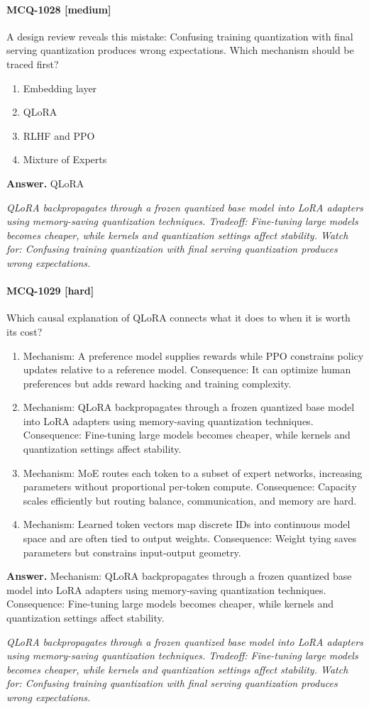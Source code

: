 \paragraph{MCQ-1028 [medium]} A design review reveals this mistake: Confusing training quantization with final serving quantization produces wrong expectations. Which mechanism should be traced first?
\begin{enumerate}[label=\Alph*.]
\item Embedding layer
\item QLoRA
\item RLHF and PPO
\item Mixture of Experts
\end{enumerate}
\noindent\textbf{Answer.} QLoRA
\par\textit{QLoRA backpropagates through a frozen quantized base model into LoRA adapters using memory-saving quantization techniques. Tradeoff: Fine-tuning large models becomes cheaper, while kernels and quantization settings affect stability. Watch for: Confusing training quantization with final serving quantization produces wrong expectations.}
\paragraph{MCQ-1029 [hard]} Which causal explanation of QLoRA connects what it does to when it is worth its cost?
\begin{enumerate}[label=\Alph*.]
\item Mechanism: A preference model supplies rewards while PPO constrains policy updates relative to a reference model. Consequence: It can optimize human preferences but adds reward hacking and training complexity.
\item Mechanism: QLoRA backpropagates through a frozen quantized base model into LoRA adapters using memory-saving quantization techniques. Consequence: Fine-tuning large models becomes cheaper, while kernels and quantization settings affect stability.
\item Mechanism: MoE routes each token to a subset of expert networks, increasing parameters without proportional per-token compute. Consequence: Capacity scales efficiently but routing balance, communication, and memory are hard.
\item Mechanism: Learned token vectors map discrete IDs into continuous model space and are often tied to output weights. Consequence: Weight tying saves parameters but constrains input-output geometry.
\end{enumerate}
\noindent\textbf{Answer.} Mechanism: QLoRA backpropagates through a frozen quantized base model into LoRA adapters using memory-saving quantization techniques. Consequence: Fine-tuning large models becomes cheaper, while kernels and quantization settings affect stability.
\par\textit{QLoRA backpropagates through a frozen quantized base model into LoRA adapters using memory-saving quantization techniques. Tradeoff: Fine-tuning large models becomes cheaper, while kernels and quantization settings affect stability. Watch for: Confusing training quantization with final serving quantization produces wrong expectations.}
